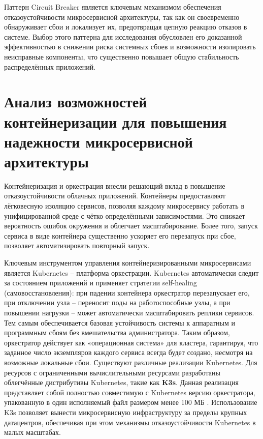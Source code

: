 Паттерн Circuit Breaker является ключевым механизмом обеспечения отказоустойчивости микросервисной архитектуры, так как он своевременно обнаруживает сбои и локализует их, предотвращая цепную реакцию отказов в системе. Выбор этого паттерна для исследования обусловлен его доказанной эффективностью в снижении риска системных сбоев и возможности изолировать неисправные компоненты, что существенно повышает общую стабильность распределённых приложений. 

\section{Анализ возможностей контейнеризации для повышения надежности микросервисной архитектуры}

Контейнеризация и оркестрация внесли решающий вклад в повышение отказоустойчивости облачных приложений. Контейнеры предоставляют лёгковесную изоляцию сервисов, позволяя каждому микросервису работать в унифицированной среде с чётко определёнными зависимостями. Это снижает вероятность ошибок окружения и облегчает масштабирование. Более того, запуск сервиса в виде контейнера существенно ускоряет его перезапуск при сбое, позволяет автоматизировать повторный запуск.

Ключевым инструментом управления контейнеризированными микросервисами является Kubernetes – платформа оркестрации. Kubernetes автоматически следит за состоянием приложений и применяет стратегии self-healing (самовосстановления): при падении контейнера оркестратор перезапускает его, при отключении узла – переносит поды на работоспособные узлы, а при повышении нагрузки – может автоматически масштабировать реплики сервисов\cite{kuber}. Тем самым обеспечивается базовая устойчивость системы к аппаратным и программным сбоям без вмешательства администратора. Таким образом, оркестратор действует как «операционная система» для кластера, гарантируя, что заданное число экземпляров каждого сервиса всегда будет создано, несмотря на возможные локальные сбои. Существуют различные реализации Kubernetes. Для ресурсов с ограниченными вычислительными ресурсами разработаны облегчённые дистрибутивы Kubernetes, такие как \textbf{K3s}. Данная реализация представляет собой полностью совместимую с Kubernetes версию оркестратора, упакованную в один исполняемый файл размером менее 100 МБ \cite{mendezk3s}. Использование K3s позволяет вынести микросервисную инфраструктуру за пределы крупных датацентров, обеспечивая при этом механизмы отказоустойчивости Kubernetes в малых масштабах.

